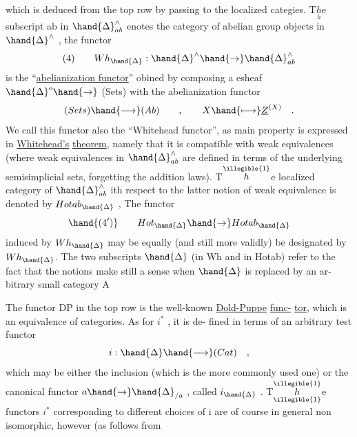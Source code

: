which is deduced from the top row by passing to the localized categies.
T$\underset{h}{h}$e  subscript ab in $\hand{\Delta}^{\wedge}_{ab}$ enotes the category of abelian
group objects in $\hand{\Delta}^{\wedge}$ , the functor 
\[ (4) \qquad Wh_{\hand{\Delta}} : \hand{\Delta}^{\wedge} \hand{\to} \hand{\Delta}^{\wedge}_{ab} \]
is the ``\uline{abelianization functor}'' obined by composing a esheaf
$\hand{\Delta}^{o} \hand{\to}$ (Sets) with the abelianization functor
\[ (Sets) \hand{\longrightarrow} (Ab) \qquad , \qquad X \hand{\longmapsto} \underline{Z}^{(X)} \quad . \]
We call this functor  also the ``Whitehead functor'', as  main property
 is expressed in \uline{Whitehead's} \uline{theorem}, namely that it
is compatible with weak equivalences (where weak equivalences in $\hand{\Delta}^{\wedge}_{ab}$
are defined in terms of the underlying semisimplicial sets, forgetting
the addition laws). T$\overset{\illegible{1}}{h}$e localized category of $\hand{\Delta}^{\wedge}_{ab}$ ith respect to
the latter notion of weak equivalence is denoted by $Hotab_{\hand{\Delta}}$ , The
functor
\[ \hand{(4')} \qquad Hot_{\hand{\Delta}} \hand{\to} Hotab_{\hand{\Delta}} \]
induced by $Wh_{\hand{\Delta}}$ may be equally (and still more validly) be designated
by $Wh_{\hand{\Delta}}$. The two subscripts $\hand{\Delta}$ (in Wh and in Hotab) refer to the
fact that the notions make still a sense when $\hand{\Delta}$ is replaced by an ar-%
bitrary small category A

The functor DP in the top row is the well-known \uline{Dold-Puppe} \uline{func-}%
\uline{tor}, which is an equivalence of categories. As for $i^*$ , it is de-%
fined in terms of an arbitrary test functor
\[ i : \hand{\Delta} \hand{\longrightarrow} (Cat) \quad , \]
which may be either the   inclusion (which is the more commonly
used one) or the canonical functor $a \hand{\to} \hand{\Delta}_{/a}$ , called $i_{\hand{\Delta}}$ . T$\overset{\illegible{1}}{\underset{\illegible{1}}{h}}$e
functors $i^*$ corresponding to different choices of i are of course
in general non isomorphic, however (as follows from  


